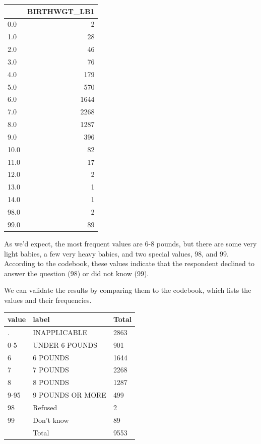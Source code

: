 \begin{tabular}{lr}
\midrule
{} &  BIRTHWGT\_LB1 \\
\midrule
0.0  &             2 \\
1.0  &            28 \\
2.0  &            46 \\
3.0  &            76 \\
4.0  &           179 \\
5.0  &           570 \\
6.0  &          1644 \\
7.0  &          2268 \\
8.0  &          1287 \\
9.0  &           396 \\
10.0 &            82 \\
11.0 &            17 \\
12.0 &             2 \\
13.0 &             1 \\
14.0 &             1 \\
98.0 &             2 \\
99.0 &            89 \\
\midrule
\end{tabular}

As we'd expect, the most frequent values are 6-8 pounds, but there are
some very light babies, a few very heavy babies, and two special values,
98, and 99. According to the codebook, these values indicate that the
respondent declined to answer the question (98) or did not know (99).

We can validate the results by comparing them to the codebook, which
lists the values and their frequencies.

\begin{longtable}[]{@{}lll@{}}
\midrule()
value & label & Total \\
\midrule()
\endhead
. & INAPPLICABLE & 2863 \\
0-5 & UNDER 6 POUNDS & 901 \\
6 & 6 POUNDS & 1644 \\
7 & 7 POUNDS & 2268 \\
8 & 8 POUNDS & 1287 \\
9-95 & 9 POUNDS OR MORE & 499 \\
98 & Refused & 2 \\
99 & Don't know & 89 \\
& Total & 9553 \\
\midrule()
\end{longtable}

